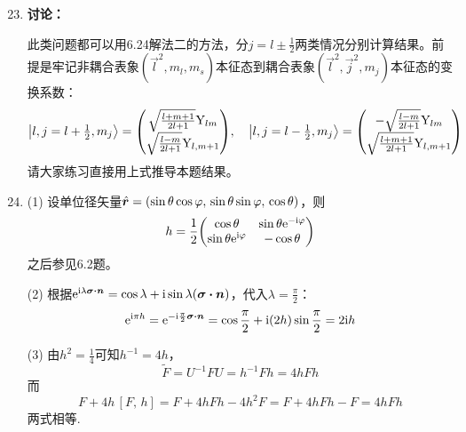 \begin{enumerate}[label=\textbf{6.\arabic*}, listparindent=\parindent, leftmargin=-0.5mm]
\setcounter{enumi}{22}
\item
{\color{red}\textbf{讨论：}}

此类问题都可以用6.24解法二的方法，分$j=l\pm\frac{1}{2}$两类情况分别计算结果。前提是牢记非耦合表象$(\vec{l}^2,m_l,m_s)$本征态到耦合表象$(\vec{l}^2,\vec{j}^2,m_j)$本征态的变换系数：
\[\ket{l,j=l+\tfrac{1}{2},m_j}=\mqty(\sqrt{\frac{l+m+1}{2l+1}}\Y_{lm}\\\sqrt{\frac{l-m}{2l+1}}\Y_{l,m+1}),\quad
\ket{l,j=l-\tfrac{1}{2},m_j}=\mqty(-\sqrt{\frac{l-m}{2l+1}}\Y_{lm}\\\sqrt{\frac{l+m+1}{2l+1}}\Y_{l,m+1})
\]
请大家练习直接用上式推导本题结果。

\setcounter{enumi}{30}
\item

\noindent (1) 设单位径矢量$\hat{\boldsymbol{r}}=(\sin\theta\cos\varphi,\,\sin\theta\sin\varphi,\,\cos\theta)$，则 
\[h=\frac{1}{2}\mqty(\cos\theta & \sin\theta\ee{-\im\varphi}\\ \sin\theta\ee{\im\varphi} & -\cos\theta)\]
之后参见6.2题。

\noindent (2) 根据$\mathrm{e}^{\mathrm{i}\lambda\boldsymbol{\sigma\cdot n}} =\cos\lambda + \mathrm{i}\sin\lambda(\boldsymbol{\sigma\cdot n})$，代入$\lambda=\frac{\pi}{2}$：
\[\mathrm{e}^{\mathrm{i}\pi h}=\mathrm{e}^{-\mathrm{i}\frac{\pi}{2}\boldsymbol{\sigma\cdot n}}=\cos\frac{\pi}{2}+\mathrm{i}(2h)\sin\frac{\pi}{2}=2\mathrm{i} h\]

\noindent (3) 由$h^2=\frac{1}{4}$可知$h^{-1}=4h$，
\[\tilde{F}=U^{-1}FU=h^{-1}F h=4hFh\]
而
\[F+4h\,[F,\,h] = F+4hFh-4h^2F = F+4hFh-F = 4hFh\]
两式相等.


\end{enumerate}
